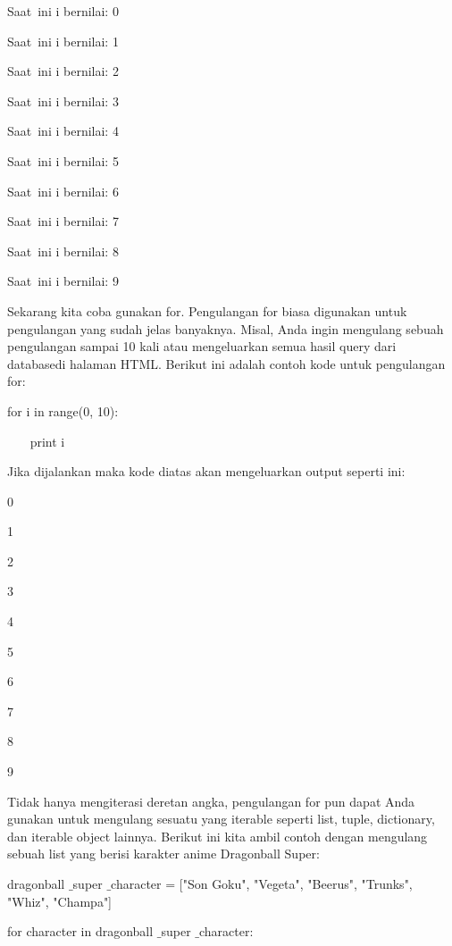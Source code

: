 \vspace{12pt}
Saat~ini i bernilai:  0 \par
Saat~ini i bernilai:  1 \par
Saat~ini i bernilai:  2 \par
Saat~ini i bernilai:  3 \par
Saat~ini i bernilai:  4 \par
Saat~ini i bernilai:  5 \par
Saat~ini i bernilai:  6 \par
Saat~ini i bernilai:  7 \par
Saat~ini i bernilai:  8 \par
Saat~ini i bernilai:  9 \par
\vspace{12pt}
Sekarang kita coba gunakan $  $for. Pengulangan $  $for $  $biasa digunakan untuk pengulangan yang sudah jelas banyaknya. Misal, Anda ingin mengulang sebuah pengulangan sampai 10 kali atau mengeluarkan semua hasil $  $query $  $dari $  $databasedi halaman HTML. Berikut ini adalah contoh kode untuk pengulangan $  $for: \par
for i in range(0, 10): \par
~~~ print i \par
Jika dijalankan maka kode diatas akan mengeluarkan $  $output $  $seperti ini: \par
\vspace{12pt}
0 \par
1 \par
2 \par
3 \par
4 \par
5 \par
6 \par
7 \par
8 \par
9 \par
Tidak hanya mengiterasi deretan angka, pengulangan $  $for $  $pun dapat Anda gunakan untuk mengulang sesuatu yang $  $iterable $  $seperti $  $list, $  $tuple, $  $dictionary, dan $  $iterable object $  $lainnya. Berikut ini kita ambil contoh dengan mengulang sebuah $  $list $  $yang berisi karakter anime Dragonball Super: \par
\vspace{12pt}
dragonball $  \_  $super $  \_  $character = ["Son Goku", "Vegeta", "Beerus", "Trunks", "Whiz", "Champa"] \par
for character in dragonball $  \_  $super $  \_  $character: \par
